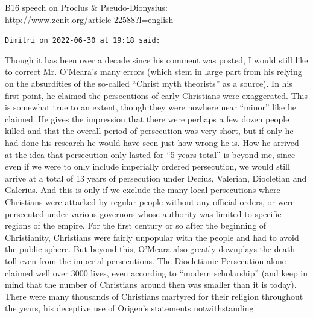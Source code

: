 \begin{footnotesize}
\begin{sffamily}
B16 speech on Proclus \& Pseudo-Dionysius:\\
\url{http://www.zenit.org/article-22588?l=english}


\hfill

\texttt{Dimitri on 2022-06-30 at 19:18 said:}

Though it has been over a decade since his comment was posted, I would still like to correct Mr. O'Meara's many errors (which stem in large part from his relying on the absurdities of the so-called ``Christ myth theorists'' as a source). In his first point, he claimed the persecutions of early Christians were exaggerated. This is somewhat true to an extent, though they were nowhere near ``minor'' like he claimed. He gives the impression that there were perhaps a few dozen people killed and that the overall period of persecution was very short, but if only he had done his research he would have seen just how wrong he is. How he arrived at the idea that persecution only lasted for ``5 years total'' is beyond me, since even if we were to only include imperially ordered persecution, we would still arrive at a total of 13 years of persecution under Decius, Valerian, Diocletian and Galerius. And this is only if we exclude the many local persecutions where Christians were attacked by regular people without any official orders, or were persecuted under various governors whose authority was limited to specific regions of the empire. For the first century or so after the beginning of Christianity, Christians were fairly unpopular with the people and had to avoid the public sphere. But beyond this, O'Meara also greatly downplays the death toll even from the imperial persecutions. The Diocletianic Persecution alone claimed well over 3000 lives, even according to ``modern scholarship'' (and keep in mind that the number of Christians around then was smaller than it is today). There were many thousands of Christians martyred for their religion throughout the years, his deceptive use of Origen's statements notwithstanding.


\end{sffamily}
\end{footnotesize}
